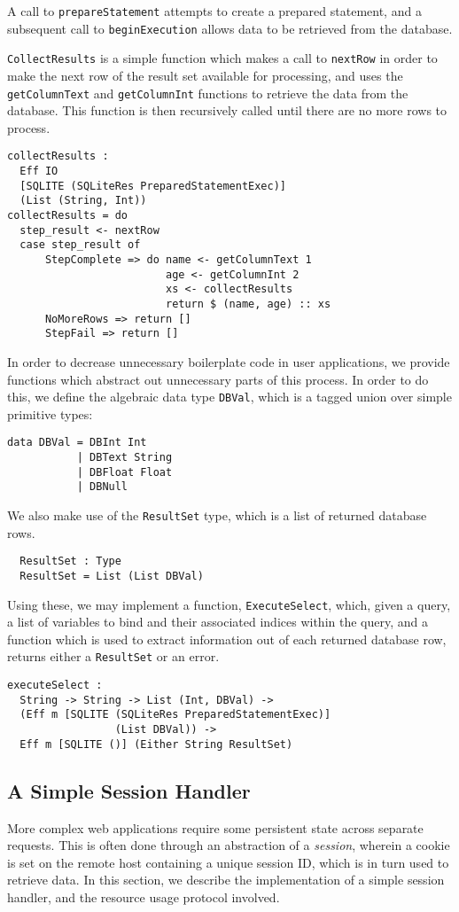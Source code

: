 A call to \texttt{prepareStatement} attempts to create a prepared statement, and a subsequent call to \texttt{beginExecution} allows data to be retrieved from the database.

\texttt{CollectResults} is a simple function which makes a call to \texttt{nextRow} in order to make the next row of the result set available for processing, and uses the \texttt{getColumnText} and \texttt{getColumnInt} functions to retrieve the data from the database. This function is then recursively called until there are no more rows to process.
\begin{Verbatim}
collectResults : 
  Eff IO 
  [SQLITE (SQLiteRes PreparedStatementExec)] 
  (List (String, Int))
collectResults = do
  step_result <- nextRow
  case step_result of
      StepComplete => do name <- getColumnText 1
                         age <- getColumnInt 2
                         xs <- collectResults
                         return $ (name, age) :: xs
      NoMoreRows => return []
      StepFail => return [] 
\end{Verbatim}
In order to decrease unnecessary boilerplate code in user applications, we provide functions which abstract out unnecessary parts of this process. In order to do this, we define the algebraic data type \texttt{DBVal}, which is a tagged union over simple primitive types:
\begin{Verbatim}
data DBVal = DBInt Int
           | DBText String
           | DBFloat Float
           | DBNull
\end{Verbatim}
We also make use of the \texttt{ResultSet} type, which is a list of returned database rows.
\begin{Verbatim}
  ResultSet : Type
  ResultSet = List (List DBVal)
\end{Verbatim}
Using these, we may implement a function, \texttt{ExecuteSelect}, which, given a query, a list of variables to bind and their associated indices within the query, and a function which is used to extract information out of each returned database row, returns either a \texttt{ResultSet} or an error.
\begin{Verbatim}
executeSelect : 
  String -> String -> List (Int, DBVal) -> 
  (Eff m [SQLITE (SQLiteRes PreparedStatementExec)] 
                 (List DBVal)) -> 
  Eff m [SQLITE ()] (Either String ResultSet)
\end{Verbatim}
\subsection{A Simple Session Handler}
More complex web applications require some persistent state across separate requests. This is often done through an abstraction of a \textit{session}, wherein a cookie is set on the remote host containing a unique session ID, which is in turn used to retrieve data. In this section, we describe the implementation of a simple session handler, and the resource usage protocol involved. 

